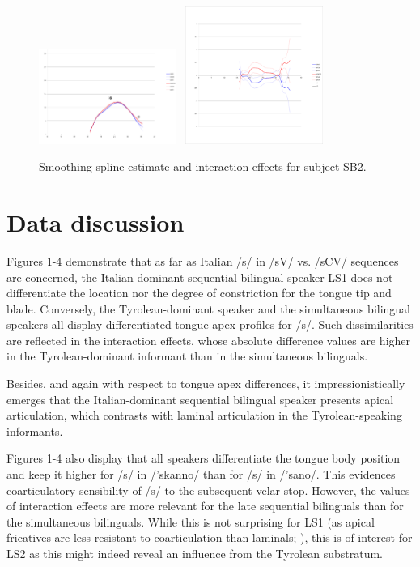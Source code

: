 \documentclass[output=paper]{LSP/langsci}
\begin{document}
  
\begin{figure}
\includegraphics[width=0.4\textwidth]{illustrations/sprea_fig4a}~
\includegraphics[width=0.4\textwidth]{illustrations/sprea_fig4b}
\label{fig:4}   
\caption{Smoothing spline estimate and interaction effects for subject SB2.}
\end{figure}

\section{Data discussion}
Figures 1-4 demonstrate that as far as Italian /s/ in /sV/ vs. /sCV/ sequences are concerned, the Italian-dominant sequential bilingual speaker LS1 does not differentiate the location nor the degree of constriction for the tongue tip and blade. Conversely, the Tyrolean-dominant speaker and the simultaneous bilingual speakers all display differentiated tongue apex profiles for /s/. Such dissimilarities are reflected in the interaction effects, whose absolute difference values are higher in the Tyrolean-dominant informant than in the simultaneous bilinguals.

Besides, and again with respect to tongue apex differences, it impressionistically emerges that the Italian-dominant sequential bilingual speaker presents apical articulation, which contrasts with laminal articulation in the Tyrolean-speaking informants.

Figures 1-4 also display that all speakers differentiate the tongue body position and keep it higher for /s/ in /'skanno/ than for /s/ in /'sano/. This evidences coarticulatory sensibility of /s/ to the subsequent velar stop. However, the values of interaction effects are more relevant for the late sequential bilinguals than for the simultaneous bilinguals. While this is not surprising for LS1 (as apical fricatives are less resistant to coarticulation than laminals; \citealt{hardcastle_lingual_1999}), this is of interest for LS2 as this might indeed reveal an influence from the Tyrolean substratum.
\end{document}

